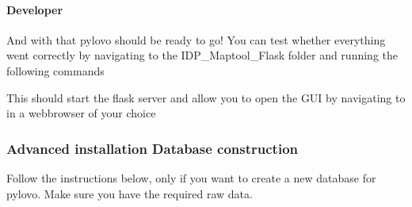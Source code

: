 \documentclass[letterpaper,10pt,english]{sphinxmanual}
\begin{document}
\paragraph{Developer}
\label{\detokenize{docs_pylovo/installation:developer}}
\begin{sphinxVerbatim}[commandchars=\\\{\}]
  
 
   \PYG{p}{[}\PYG{p}{]}
\end{sphinxVerbatim}

\sphinxAtStartPar
And with that pylovo should be ready to go! You can test whether everything went correctly by navigating
to the IDP\_Maptool\_Flask folder and running the following commands

\begin{sphinxVerbatim}[commandchars=\\\{\}]
  
 
    
\end{sphinxVerbatim}

\sphinxAtStartPar
This should start the flask server and allow you to open the GUI by navigating to  in a webbrowser of your choice


\subsubsection{Advanced installation \sphinxhyphen{} Database construction}
\label{\detokenize{docs_pylovo/installation:advanced-installation-database-construction}}
\begin{DUlineblock}{0em}
\item[] Follow the instructions below, only if you want to create a new database for pylovo.
Make sure you have the required raw data.
\end{DUlineblock}
\end{document}
